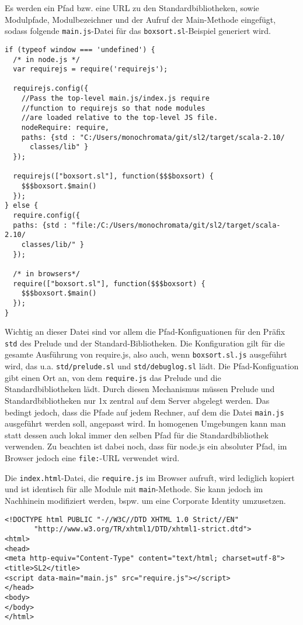 \documentclass[runningheads]{llncs}
\begin{document}
Es werden ein Pfad bzw. eine URL zu den Standardbibliotheken, sowie
Modulpfade, Modulbezeichner und der Aufruf der Main-Methode eingefügt,
sodass folgende \texttt{main.js}-Datei für das
\texttt{boxsort.sl}-Beispiel generiert wird.

\begin{verbatim}
if (typeof window === 'undefined') {
  /* in node.js */
  var requirejs = require('requirejs');

  requirejs.config({
    //Pass the top-level main.js/index.js require
    //function to requirejs so that node modules
    //are loaded relative to the top-level JS file.
    nodeRequire: require,
    paths: {std : "C:/Users/monochromata/git/sl2/target/scala-2.10/
      classes/lib" }
  });

  requirejs(["boxsort.sl"], function($$$boxsort) {
    $$$boxsort.$main()
  });
} else {
  require.config({
  paths: {std : "file:/C:/Users/monochromata/git/sl2/target/scala-2.10/
    classes/lib/" }
  });

  /* in browsers*/ 
  require(["boxsort.sl"], function($$$boxsort) {
    $$$boxsort.$main()
  });
}
\end{verbatim}

Wichtig an dieser Datei sind vor allem die Pfad-Konfiguationen für
den Präfix \texttt{std} des Prelude und der Standard-Bibliotheken.
Die Konfiguration gilt für die gesamte Ausführung von require.js, also
auch, wenn \texttt{boxsort.sl.js} ausgeführt wird, das u.a.
\texttt{std/prelude.sl} und \texttt{std/debuglog.sl} lädt. Die
Pfad-Konfiguation gibt einen Ort an, von dem \texttt{require.js}
das Prelude und die Standardbibliotheken lädt. Durch diesen Mechanismus
müssen Prelude und Standardbibliotheken nur 1x zentral auf dem Server
abgelegt werden. Das bedingt jedoch, dass die Pfade auf jedem Rechner,
auf dem die Datei \texttt{main.js} ausgeführt werden soll, angepasst
wird. In homogenen Umgebungen kann man statt dessen auch lokal immer
den selben Pfad für die Standardbibliothek verwenden. Zu beachten
ist dabei noch, dass für node.js ein absoluter Pfad, im Browser jedoch
eine \texttt{file:}-URL verwendet wird.

Die \texttt{index.html}-Datei, die \texttt{require.js} im Browser
aufruft, wird lediglich kopiert und ist identisch für alle Module
mit \texttt{main}-Methode. Sie kann jedoch im Nachhinein modifiziert
werden, bspw. um eine Corporate Identity umzusetzen.

\begin{verbatim}
<!DOCTYPE html PUBLIC "-//W3C//DTD XHTML 1.0 Strict//EN"
       "http://www.w3.org/TR/xhtml1/DTD/xhtml1-strict.dtd">
<html>
<head>
<meta http-equiv="Content-Type" content="text/html; charset=utf-8">
<title>SL2</title>
<script data-main="main.js" src="require.js"></script>
</head>
<body>
</body>
</html>
\end{verbatim}
\end{document}
